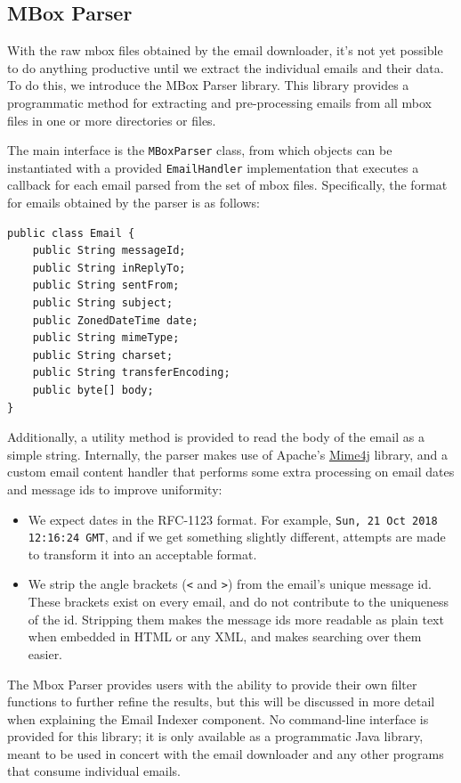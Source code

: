 \documentclass[a4paper, 12pt]{article}
\begin{document}
	\newpage
	\subsection{MBox Parser}
		\label{sec:mbox-parser}
		With the raw mbox files obtained by the email downloader, it's not yet possible to do anything productive until we extract the individual emails and their data. To do this, we introduce the MBox Parser library. This library provides a programmatic method for extracting and pre-processing emails from all mbox files in one or more directories or files.
		
		The main interface is the \texttt{MBoxParser} class, from which objects can be instantiated with a provided \texttt{EmailHandler} implementation that executes a callback for each email parsed from the set of mbox files. Specifically, the format for emails obtained by the parser is as follows:
		
		\begin{verbatim}
public class Email {
	public String messageId;
	public String inReplyTo;
	public String sentFrom;
	public String subject;
	public ZonedDateTime date;
	public String mimeType;
	public String charset;
	public String transferEncoding;
	public byte[] body;
}
		\end{verbatim}
	
		Additionally, a utility method is provided to read the body of the email as a simple string. Internally, the parser makes use of Apache's \href{https://james.apache.org/mime4j/}{Mime4j} library, and a custom email content handler that performs some extra processing on email dates and message ids to improve uniformity:
		
		\begin{itemize}
			\item We expect dates in the RFC-1123 format. For example, \texttt{Sun, 21 Oct 2018 12:16:24 GMT}, and if we get something slightly different, attempts are made to transform it into an acceptable format.
			\item We strip the angle brackets (\texttt{<} and \texttt{>}) from the email's unique message id. These brackets exist on every email, and do not contribute to the uniqueness of the id. Stripping them makes the message ids more readable as plain text when embedded in HTML or any XML, and makes searching over them easier.
		\end{itemize}

		The Mbox Parser provides users with the ability to provide their own filter functions to further refine the results, but this will be discussed in more detail when explaining the Email Indexer component. No command-line interface is provided for this library; it is only available as a programmatic Java library, meant to be used in concert with the email downloader and any other programs that consume individual emails.
	
\end{document}
